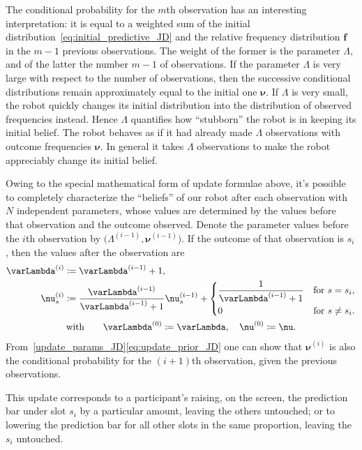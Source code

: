 \documentclass[\ifafour a4paper,12pt,\else a5paper,10pt,\fi%
onecolumn,oneside,article,%
british%
]{memoir}
\theoremstyle{remark}
\theoremstyle{innote}
\newcommand*{\defd}{\coloneqq}
\renewcommand*{\|}{\mathpunct{|}}
\newcommand*{\yff}{f}
\newcommand*{\yf}{\bm{\yff}}
\newcommand*{\yN}{\varLambda}
\newcommand*{\yNo}[1]{\yN^{(#1)}}
\newcommand*{\ynn}{\nu}
\newcommand*{\yn}{\bm{\nu}}
\newcommand*{\yno}[1]{\yn^{(#1)}}
\newcommand*{\ynno}[1]{\ynn^{(#1)}}
\begin{document}
The conditional probability for the $m$th observation has an interesting
interpretation: it is equal to a weighted sum of the initial
distribution~\eqref{eq:initial_predictive_JD} and the relative frequency
distribution $\yf$ in the $m-1$ previous observations. The weight of the
former is the parameter $\yN$, and of the latter the number $m-1$ of
observations. If the parameter $\yN$ is very large with respect to the
number of observations, then the successive conditional distributions
remain approximately equal to the initial one $\yn$. If $\yN$ is very
small, the robot quickly changes its initial distribution into the
distribution of observed frequencies instead. Hence $\yN$ quantifies how
\enquote{stubborn} the robot is in keeping its initial belief. The robot
behaves as if it had already made $\yN$ observations with outcome
frequencies $\yn$. In general it takes $\yN$ observations to make the robot
appreciably change its initial belief.

Owing to the special mathematical form of update formulae above, it's
possible to completely characterize the \enquote{beliefs} of our robot
after each observation with $N$ independent parameters, whose values are
determined by the values before that observation and the outcome observed.
Denote the parameter values before the $i$th observation by
$\bigl( \yNo{i-1}, \yno{i-1} \bigr)$. If the outcome of that observation is
$s_i$, then the values after the observation are
\begin{equation}
  \label{update_params_JD}
  \begin{gathered}
  \begin{aligned}
    \yNo{i} &\defd \yNo{i-1}+1,
    \\
    \ynno{i}_s &\defd \frac{\yNo{i-1}}{\yNo{i-1}+1}\ynno{i-1}_s +
    \begin{dcases}
      \frac{1}{\yNo{i-1}+1} &\text{for $s=s_{i}$},
      \\
      0 &\text{for $s\ne s_{i}$}.
    \end{dcases}
  \end{aligned}
  \\\text{with}\qquad
  \yNo{0}\defd\yN,
  \quad
  \yno{0} \defd\yn.
  \end{gathered}
\end{equation}
From~\eqref{update_params_JD}\eqref{eq:update_prior_JD} one can show that
$\yno{i}$ is also the conditional probability for the $(i+1)$th
observation, given the previous observations.

This update corresponds to a participant's raising, on the screen, the
prediction bar under slot $s_{i}$ by a particular amount, leaving the
others untouched; or to lowering the prediction bar for all other slots in
the same proportion, leaving the $s_{i}$ untouched.
\end{document}
